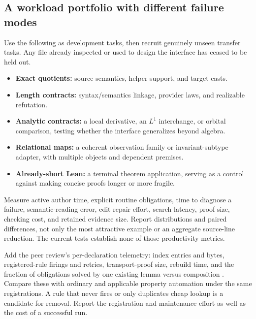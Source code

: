 \documentclass[11pt,letterpaper]{article}
\newcommand{\code}[1]{\texttt{\detokenize{#1}}}
\theoremstyle{definition}\newtheorem{definition}[proposition]{Definition}
\theoremstyle{remark}\newtheorem{remark}[proposition]{Remark}
\begin{document}
\subsection{A workload portfolio with different failure modes}
Use the following as development tasks, then recruit genuinely unseen transfer
tasks. Any file already inspected or used to design the interface has ceased
to be held out.
\begin{itemize}
\item \textbf{Exact quotients:} source semantics, helper support, and target casts.
\item \textbf{Length contracts:} syntax/semantics linkage, provider laws, and
realizable refutation.
\item \textbf{Analytic contracts:} a local derivative, an $L^1$ interchange, or
orbital comparison, testing whether the interface generalizes beyond algebra.
\item \textbf{Relational maps:} a coherent observation family or invariant-subtype
adapter, with multiple objects and dependent premises.
\item \textbf{Already-short Lean:} a terminal theorem application, serving as a
control against making concise proofs longer or more fragile.
\end{itemize}

Measure active author time, explicit routine obligations, time to diagnose a
failure, semantic-reading error, edit repair effort, search latency, proof size,
checking cost, and retained evidence size. Report distributions and paired
differences, not only the most attractive example or an aggregate source-line
reduction. The current tests establish none of those productivity metrics.

Add the peer review's per-declaration telemetry: index entries and bytes,
registered-rule firings and retries, transport-proof size, rebuild time, and
the fraction of obligations solved by one existing lemma versus composition
\cite[Section 11]{round3-peer}. Compare these with ordinary \code{exact?} and
applicable property automation under the same registrations. A rule that never
fires or only duplicates cheap lookup is a candidate for removal. Report the
registration and maintenance effort as well as the cost of a successful run.
\end{document}
